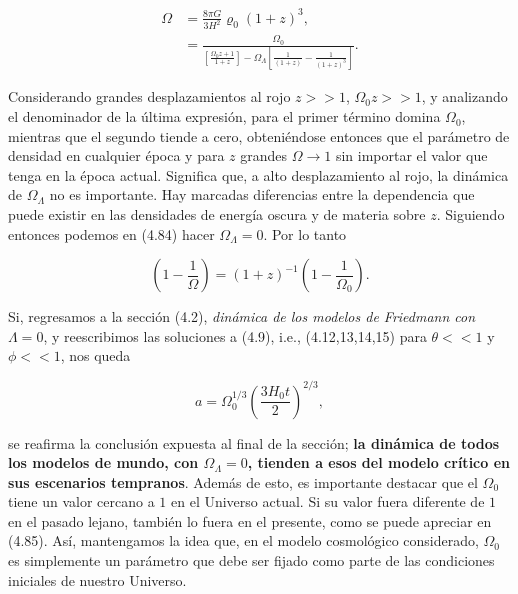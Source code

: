 \documentclass[11pt]{article}
\begin{document}
{\begin{itemize}
    \begin{align}
        \Omega & = \frac{8 \pi G }{3 H^2}  \varrho_0(1+z)^3, \\
        & = \frac{\Omega_0}{\left[ \frac{\Omega_0 z+1}{1+z} \right]  - {\Omega_{\Lambda} \left[ \frac{1}{(1+z)} - \frac{1}{(1+z)^3} \right]}}.  
    \end{align}

    Considerando grandes desplazamientos al rojo $z >> 1$, $\Omega_0 z >> 1$, y analizando el denominador de la última expresión, para el primer término domina $\Omega_0$, mientras que el segundo tiende a cero, obteniéndose entonces que el parámetro de densidad en cualquier época y para $z$ grandes  $\Omega \rightarrow{1}$ sin importar el valor que tenga en la época actual. Significa que, a alto desplazamiento al rojo, la dinámica de $\Omega_{\Lambda}$ no es importante. Hay marcadas diferencias entre la dependencia que puede existir en las densidades de energía oscura y de materia sobre $z$. Siguiendo entonces podemos en (4.84) hacer $\Omega_{\Lambda} = 0$. Por lo tanto
    
    
    \begin{equation}
        \left( 1 - \frac{1}{\Omega} \right) = (1+z)^{-1} \left( 1 - \frac{1}{\Omega_0} \right).
    \end{equation} 

    Si, regresamos a la sección (4.2), {\textit{dinámica de los modelos de Friedmann con $\Lambda = 0$}}, y reescribimos las soluciones a (4.9), i.e., (4.12,13,14,15) para $\theta << 1$ y $\phi <<1$, nos queda
    
    \begin{equation}
        a = \Omega_0^{1/3} \left( \frac{3 H_0 t}{2} \right)^{2/3},
    \end{equation}
    
   \end{itemize} 
    
    se reafirma la conclusión expuesta al final de la sección; {\bf{la dinámica de todos los modelos de mundo, con $\Omega_{\Lambda} =0$, tienden a esos del modelo crítico en sus escenarios tempranos}}. Además de esto, es importante destacar que el $\Omega_0$ tiene un valor cercano a $1$ en el Universo actual. Si su valor fuera diferente de $1$ en el pasado lejano, también lo fuera en el presente, como se puede apreciar en (4.85). Así, mantengamos la idea que, en el modelo cosmológico considerado, $\Omega_0$ es simplemente un parámetro que debe ser fijado como parte de las condiciones iniciales de nuestro Universo. 
    
}
\end{document}
